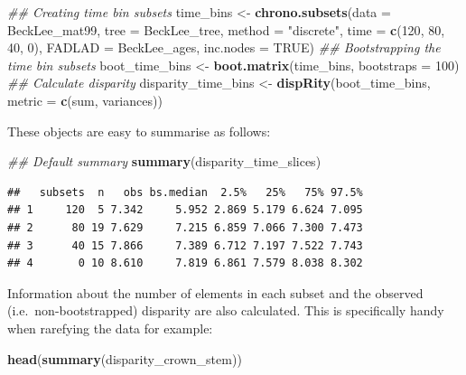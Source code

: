 \documentclass[]{book}
\newenvironment{Shaded}{\begin{snugshade}}{\end{snugshade}}
\newcommand{\CommentTok}[1]{\textcolor[rgb]{0.56,0.35,0.01}{\textit{#1}}}
\newcommand{\DataTypeTok}[1]{\textcolor[rgb]{0.13,0.29,0.53}{#1}}
\newcommand{\DecValTok}[1]{\textcolor[rgb]{0.00,0.00,0.81}{#1}}
\newcommand{\KeywordTok}[1]{\textcolor[rgb]{0.13,0.29,0.53}{\textbf{#1}}}
\newcommand{\NormalTok}[1]{#1}
\newcommand{\OtherTok}[1]{\textcolor[rgb]{0.56,0.35,0.01}{#1}}
\newcommand{\StringTok}[1]{\textcolor[rgb]{0.31,0.60,0.02}{#1}}
\begin{document}
\begin{Shaded}
\begin{Highlighting}[]
\CommentTok{## Creating time bin subsets}
\NormalTok{time_bins <-}\StringTok{ }\KeywordTok{chrono.subsets}\NormalTok{(}\DataTypeTok{data =}\NormalTok{ BeckLee_mat99,}
                            \DataTypeTok{tree =}\NormalTok{ BeckLee_tree, }
                            \DataTypeTok{method =} \StringTok{"discrete"}\NormalTok{,}
                            \DataTypeTok{time =} \KeywordTok{c}\NormalTok{(}\DecValTok{120}\NormalTok{, }\DecValTok{80}\NormalTok{, }\DecValTok{40}\NormalTok{, }\DecValTok{0}\NormalTok{),}
                            \DataTypeTok{FADLAD =}\NormalTok{ BeckLee_ages,}
                            \DataTypeTok{inc.nodes =} \OtherTok{TRUE}\NormalTok{)}
\CommentTok{## Bootstrapping the time bin subsets}
\NormalTok{boot_time_bins <-}\StringTok{ }\KeywordTok{boot.matrix}\NormalTok{(time_bins, }\DataTypeTok{bootstraps =} \DecValTok{100}\NormalTok{)}
\CommentTok{## Calculate disparity}
\NormalTok{disparity_time_bins <-}\StringTok{ }\KeywordTok{dispRity}\NormalTok{(boot_time_bins,}
                                \DataTypeTok{metric =} \KeywordTok{c}\NormalTok{(sum, variances))}
\end{Highlighting}
\end{Shaded}

These objects are easy to summarise as follows:

\begin{Shaded}
\begin{Highlighting}[]
\CommentTok{## Default summary}
\KeywordTok{summary}\NormalTok{(disparity_time_slices)}
\end{Highlighting}
\end{Shaded}

\begin{verbatim}
##   subsets  n   obs bs.median  2.5%   25%   75% 97.5%
## 1     120  5 7.342     5.952 2.869 5.179 6.624 7.095
## 2      80 19 7.629     7.215 6.859 7.066 7.300 7.473
## 3      40 15 7.866     7.389 6.712 7.197 7.522 7.743
## 4       0 10 8.610     7.819 6.861 7.579 8.038 8.302
\end{verbatim}

Information about the number of elements in each subset and the observed (i.e.~non-bootstrapped) disparity are also calculated.
This is specifically handy when rarefying the data for example:

\begin{Shaded}
\begin{Highlighting}[]
\KeywordTok{head}\NormalTok{(}\KeywordTok{summary}\NormalTok{(disparity_crown_stem))}
\end{Highlighting}
\end{Shaded}
\end{document}
